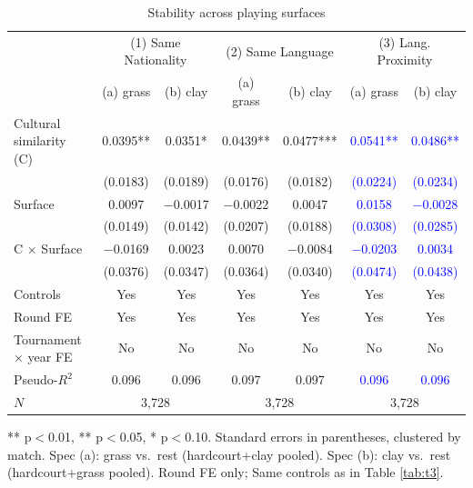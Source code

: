 \documentclass[10pt]{article}
\begin{document}
\begin{table}[htbp]
\color{blue}
\centering
\caption{Stability across playing surfaces \label{tab:t5}}
\begin{threeparttable}
\begin{tabular}{lcccccc}
\toprule
 & \multicolumn{2}{c}{(1) Same Nationality} & \multicolumn{2}{c}{(2) Same Language} & \multicolumn{2}{c}{(3) Lang. Proximity} \\
 & (a) grass & (b) clay & (a) grass & (b) clay & (a) grass & (b) clay \\
\midrule
Cultural similarity (C) & 0.0395** & 0.0351* & 0.0439** & 0.0477*** & \textcolor{blue}{0.0541**} & \textcolor{blue}{0.0486**} \\
 & (0.0183) & (0.0189) & (0.0176) & (0.0182) & \textcolor{blue}{(0.0224)} & \textcolor{blue}{(0.0234)} \\
Surface & 0.0097 & $-$0.0017 & $-$0.0022 & 0.0047 & \textcolor{blue}{0.0158} & \textcolor{blue}{$-$0.0028} \\
 & (0.0149) & (0.0142) & (0.0207) & (0.0188) & \textcolor{blue}{(0.0308)} & \textcolor{blue}{(0.0285)} \\
C $\times$ Surface & $-$0.0169 & 0.0023 & 0.0070 & $-$0.0084 & \textcolor{blue}{$-$0.0203} & \textcolor{blue}{0.0034} \\
 & (0.0376) & (0.0347) & (0.0364) & (0.0340) & \textcolor{blue}{(0.0474)} & \textcolor{blue}{(0.0438)} \\
\midrule
Controls  & Yes & Yes & Yes & Yes & Yes & Yes \\
Round FE & Yes & Yes & Yes & Yes & Yes & Yes \\
Tournament $\times$ year FE & No & No & No & No & No & No \\
Pseudo-$R^2$ & 0.096 & 0.096 & 0.097 & 0.097 & \textcolor{blue}{0.096} & \textcolor{blue}{0.096} \\
$N$ & \multicolumn{2}{c}{3,728} & \multicolumn{2}{c}{3,728} & \multicolumn{2}{c}{3,728} \\
\bottomrule
\end{tabular}
\begin{tablenotes}
\small
\item *** p$<$0.01, ** p$<$0.05, * p$<$0.10. Standard errors in parentheses, clustered by match. Spec (a): grass vs.\ rest (hardcourt+clay pooled). Spec (b): clay vs.\ rest (hardcourt+grass pooled). Round FE only; Same controls as in  Table \ref{tab:t3}. 
\end{tablenotes}
\end{threeparttable}
\end{table}
\FloatBarrier
\end{document}
